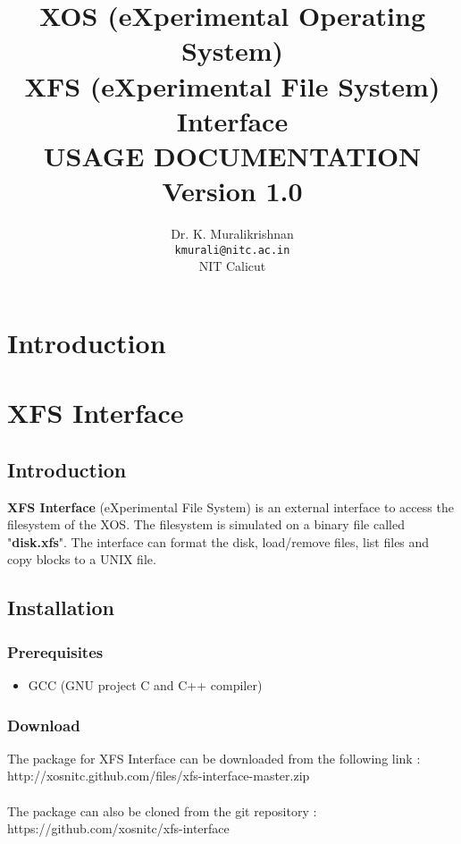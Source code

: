 \documentclass[11pt]{report}
\title{XOS (eXperimental Operating System) \\ XFS (eXperimental File System) Interface \\
USAGE DOCUMENTATION \\
Version 1.0}
\author{Dr. K. Muralikrishnan  \\ \texttt{kmurali@nitc.ac.in} \\ {NIT Calicut} }
\begin{document}
\maketitle
\pagebreak

\thispagestyle{plain}

\tableofcontents
\pagebreak




\chapter{Introduction}



\chapter{XFS Interface}

\section{Introduction}
\textbf{XFS Interface} (eXperimental File System) is an external interface to access the filesystem of the XOS. The filesystem is simulated on a binary file called "\textbf{disk.xfs}". The interface can format the disk, load/remove files, list files and copy blocks to a UNIX file.

\section{Installation}
\subsection{Prerequisites}
\begin{itemize}
	\item GCC (GNU project C and C++ compiler)
\end{itemize}

\subsection{Download}

The package for XFS Interface can be downloaded from the following link :\\
http://xosnitc.github.com/files/xfs-interface-master.zip \\ \\
The package can also be cloned from the git repository : \\
https://github.com/xosnitc/xfs-interface
\end{document}
